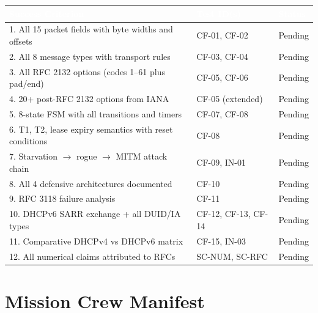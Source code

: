 \documentclass[11pt,letterpaper]{article}
\newcommand{\tableheader}[1]{\textbf{\sffamily\textcolor{white}{#1}}}
\begin{document}
\begin{center}
\begin{tabularx}{\textwidth}{XL{3.5cm}C{1.5cm}}
\toprule
{}
\tableheader{Success Criterion} & \tableheader{Test ID(s)} & \tableheader{Status} \\
. All 15 packet fields with byte widths and offsets & CF-01, CF-02 & Pending \\
2. All 8 message types with transport rules & CF-03, CF-04 & Pending \\
3. All RFC 2132 options (codes 1--61 plus pad/end) & CF-05, CF-06 & Pending \\
4. 20+ post-RFC 2132 options from IANA & CF-05 (extended) & Pending \\
5. 8-state FSM with all transitions and timers & CF-07, CF-08 & Pending \\
6. T1, T2, lease expiry semantics with reset conditions & CF-08 & Pending \\
7. Starvation $\to$ rogue $\to$ MITM attack chain & CF-09, IN-01 & Pending \\
8. All 4 defensive architectures documented & CF-10 & Pending \\
9. RFC 3118 failure analysis & CF-11 & Pending \\
10. DHCPv6 SARR exchange + all DUID/IA types & CF-12, CF-13, CF-14 & Pending \\
11. Comparative DHCPv4 vs DHCPv6 matrix & CF-15, IN-03 & Pending \\
12. All numerical claims attributed to RFCs & SC-NUM, SC-RFC & Pending \\
\bottomrule
\end{tabularx}
\end{center}

\section{Mission Crew Manifest}
\end{document}

